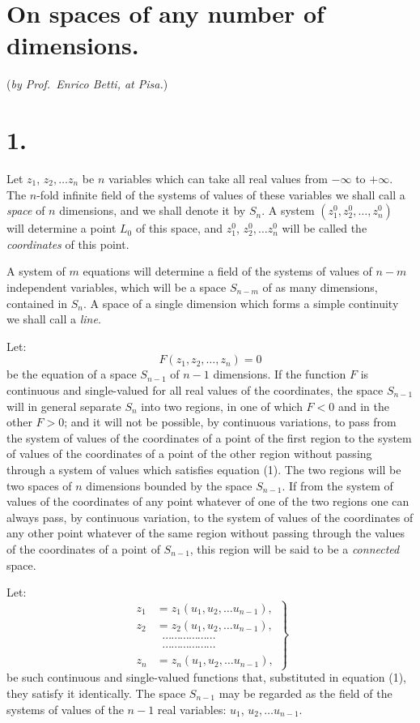 \documentclass{article}
\begin{document}
\section*{On spaces of any number of dimensions.}

(\emph{by Prof.\ Enrico Betti, at Pisa.})

\section*{1.}

Let $z_{1}$, $z_{2},\ldots z_{n}$ be $n$ variables which can take all real values from $-\infty$ to $+\infty$. The $n$-fold infinite field of the systems of values of these variables we shall call a \emph{space} of $n$ dimensions, and we shall denote it by $S_{n}$. A system $(z_{1}^{0}, z_{2}^{0},\ldots, z_{n}^{0})$ will determine a point $L_{0}$ of this space, and $z_{1}^{0}$, $z_{2}^{0},\ldots z_{n}^{0}$ will be called the \emph{coordinates} of this point.

A system of $m$ equations will determine a field of the systems of values of $n-m$ independent variables, which will be a space $S_{n-m}$ of as many dimensions, contained in $S_{n}$. A space of a single dimension which forms a simple continuity we shall call a \emph{line}.

Let:
\[ F(z_{1}, z_{2},\ldots, z_{n}) = 0 \tag{1} \]
be the equation of a space $S_{n-1}$ of $n-1$ dimensions. If the function $F$ is continuous and single-valued for all real values of the coordinates, the space $S_{n-1}$ will in general separate $S_{n}$ into two regions, in one of which $F < 0$ and in the other $F > 0$; and it will not be possible, by continuous variations, to pass from the system of values of the coordinates of a point of the first region to the system of values of the coordinates of a point of the other region without passing through a system of values which satisfies equation (1). The two regions will be two spaces of $n$ dimensions bounded by the space $S_{n-1}$. If from the system of values of the coordinates of any point whatever of one of the two regions one can always pass, by continuous variation, to the system of values of the coordinates of any other point whatever of the same region without passing through the values of the coordinates of a point of $S_{n-1}$, this region will be said to be a \emph{connected} space.


Let:
\[
\left.
\begin{aligned}
z_{1} &= z_{1}(u_{1}, u_{2},\ldots u_{n-1}),\\
z_{2} &= z_{2}(u_{1}, u_{2},\ldots u_{n-1}),\\
&\;\;\cdots\cdots\cdots\cdots\cdots\cdots\\
&\;\;\cdots\cdots\cdots\cdots\cdots\cdots\\
z_{n} &= z_{n}(u_{1}, u_{2},\ldots u_{n-1}),
\end{aligned}
\right\}
\tag{2}
\]
be such continuous and single-valued functions that, substituted in equation (1), they satisfy it identically. The space $S_{n-1}$ may be regarded as the field of the systems of values of the $n-1$ real variables: $u_{1}$, $u_{2},\ldots u_{n-1}$.
\end{document}
